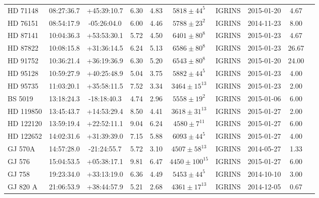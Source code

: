 \begin{scriptsize}
\begin{longtable}{lcccccrccc}
    HD 71148 &   08:27:36.7 &   +45:39:10.7 &   6.30 &  4.83 &     $5818 \pm 44^{5}$ &      IGRINS &      2015-01-20 &              4.67  \\
   HD 76151 &   08:54:17.9 &   -05:26:04.0 &   6.00 &  4.46 &     $5788 \pm 23^{2}$ &      IGRINS &      2014-11-23 &              8.00  \\
    HD 87141 &   10:04:36.3 &   +53:53:30.1 &   5.72 &  4.50 &     $6401 \pm 80^{8}$ &      IGRINS &      2015-01-23 &              4.67  \\
    HD 87822 &   10:08:15.8 &   +31:36:14.5 &   6.24 &  5.13 &     $6586 \pm 80^{8}$ &      IGRINS &      2015-01-23 &             26.67  \\
    HD 91752 &   10:36:21.4 &   +36:19:36.9 &   6.30 &  5.20 &     $6543 \pm 80^{8}$ &      IGRINS &      2015-01-20 &             24.00  \\
    HD 95128 &   10:59:27.9 &   +40:25:48.9 &   5.04 &  3.75 &     $5882 \pm 44^{5}$ &      IGRINS &      2015-01-23 &              4.00  \\
    HD 95735 &   11:03:20.1 &   +35:58:11.5 &   7.52 &  3.34 &    $3464 \pm 15^{13}$ &      IGRINS &      2015-01-23 &              2.00  \\
    BS 5019 &   13:18:24.3 &   -18:18:40.3 &   4.74 &  2.96 &     $5558 \pm 19^{2}$ &      IGRINS &      2015-01-06 &              6.00  \\
  HD 119850 &   13:45:43.7 &   +14:53:29.4 &   8.50 &  4.41 &    $3618 \pm 31^{13}$ &      IGRINS &      2015-01-27 &              2.00  \\
  HD 122120 &   13:59:19.4 &   +22:52:11.1 &   9.04 &  6.24 &     $4580 \pm 7^{11}$ &      IGRINS &      2015-01-27 &              6.00  \\
  HD 122652 &   14:02:31.6 &   +31:39:39.0 &   7.15 &  5.88 &     $6093 \pm 44^{5}$ &      IGRINS &      2015-01-27 &              4.00  \\
     GJ 570A &   14:57:28.0 &   -21:24:55.7 &   5.72 &  3.10 &    $4507 \pm 58^{13}$ &      IGRINS &      2014-05-27 &              1.33  \\
     GJ 576 &   15:04:53.5 &   +05:38:17.1 &   9.81 &  6.47 &   $4450 \pm 100^{15}$ &      IGRINS &      2015-01-27 &              6.00  \\
     GJ 758 &   19:23:34.0 &   +33:13:19.0 &   6.36 &  4.49 &     $5453 \pm 44^{5}$ &      IGRINS &      2014-10-10 &              3.00  \\
    GJ 820 A &   21:06:53.9 &   +38:44:57.9 &   5.21 &  2.68 &    $4361 \pm 17^{13}$ &      IGRINS &      2014-12-05 &              0.67  \\

\end{longtable}
\end{scriptsize}
